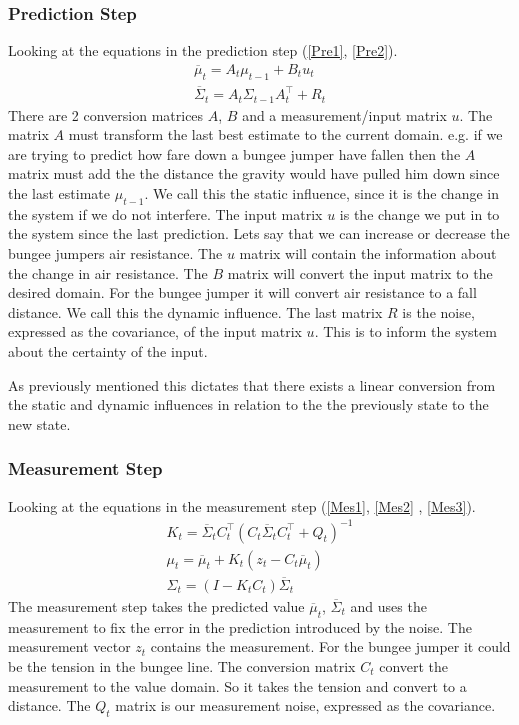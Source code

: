 \subsubsection{Prediction Step}
Looking at the equations in the prediction step (\ref{Pre1}, \ref{Pre2}).
\begin{gather}
\overline{\mu}_t = A_t \mu_{t-1} + B_t u_t
\label{Pre1}\\
\overline{\Sigma}_t = A_t \Sigma_{t-1} A^{\intercal}_t+ R_t
\label{Pre2}
\end{gather}
There are 2 conversion matrices $A$, $B$ and a measurement/input matrix $u$. The matrix $A$ must transform the last best estimate to the current domain. e.g. if we are trying to predict how fare down a bungee jumper have fallen then the $A$ matrix must add the the distance the gravity would have pulled him down since the last estimate $\mu_{t-1}$. We call this the static influence, since it is the change in the system if we do not interfere. The input matrix $u$ is the change we put in to the system since the last prediction. Lets say that we can increase or decrease the bungee jumpers air resistance. The $u$ matrix will contain the information about the change in air resistance. The $B$ matrix will convert the input matrix to the desired domain. For the bungee jumper it will convert air resistance to a fall distance. We call this the dynamic influence.
The last matrix $R$ is the noise, expressed as the covariance, of the input matrix $u$. This is to inform the system about the certainty of the input. 

As previously mentioned this dictates that there exists a linear conversion from the static and dynamic influences in relation to the the previously state to the new state. 
\subsubsection{Measurement Step}
Looking at the equations in the measurement step (\ref{Mes1}, \ref{Mes2} , \ref{Mes3}).
\begin{gather}
K_t = \overline{\Sigma}_t C^{\intercal}_t ( C_t \overline{\Sigma}_t C^{\intercal}_t + Q_t ) ^{-1} 
\label{Mes1} \\
\mu_{t} = \overline{\mu}_t +K_t (z_t-C_t\overline{\mu}_t) 
\label{Mes2} \\
\Sigma_t = (I-K_t C_t) \overline{\Sigma}_t 
\label{Mes3}
\end{gather}
The measurement step takes the predicted value $\overline{\mu}_t$, $\overline{\Sigma}_t$ and uses the measurement to fix the error in the prediction introduced by the noise. The measurement vector $z_t$ contains the measurement. For the bungee jumper it could be the tension in the bungee line. The conversion matrix $C_t$ convert the measurement to the value domain. So it takes the tension and convert to a distance. The $Q_t$ matrix is our measurement noise, expressed as the covariance.

